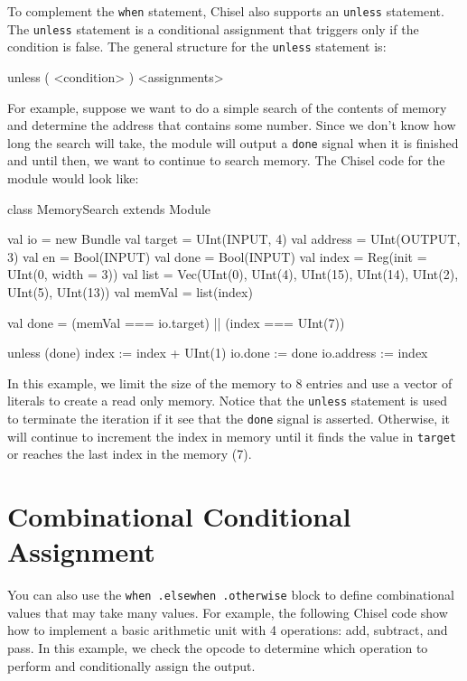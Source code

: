 
To complement the \verb+when+ statement, Chisel also supports an \verb+unless+ statement. The \verb+unless+ statement is a conditional assignment that triggers only if the condition is false. The general structure for the \verb+unless+ statement is:

\begin{scala}
unless ( <condition> ) { <assignments> }
\end{scala}

For example, suppose we want to do a simple search of the contents of memory and determine the address that contains some number. Since we don't know how long the search will take, the module will output a \verb+done+ signal when it is finished and until then, we want to continue to search memory. The Chisel code for the module would look like:

\begin{scala}
class MemorySearch extends Module {
  val io = new Bundle {
    val target  = UInt(INPUT,  4)
    val address = UInt(OUTPUT, 3)
    val en      = Bool(INPUT)
    val done    = Bool(INPUT)
  }
  val index  = Reg(init = UInt(0, width = 3))
  val list   = Vec(UInt(0), UInt(4), UInt(15), UInt(14), UInt(2), UInt(5), UInt(13))
  val memVal = list(index)

  val done = (memVal === io.target) || (index === UInt(7))

  unless (done) {
    index := index + UInt(1)
  }
  io.done    := done
  io.address := index
}
\end{scala}

In this example, we limit the size of the memory to 8 entries and use a vector of literals to create a read only memory. Notice that the \verb+unless+ statement is used to terminate the iteration if it see that the \verb+done+ signal is asserted. Otherwise, it will continue to increment the index in memory until it finds the value in \verb+target+ or reaches the last index in the memory (7).

\section{Combinational Conditional Assignment}

You can also use the \verb+when .elsewhen .otherwise+ block to define combinational values that may take many values. For example, the following Chisel code show how to implement a basic arithmetic unit with 4 operations: add, subtract, and pass. In this example, we check the opcode to determine which operation to perform and conditionally assign the output.

